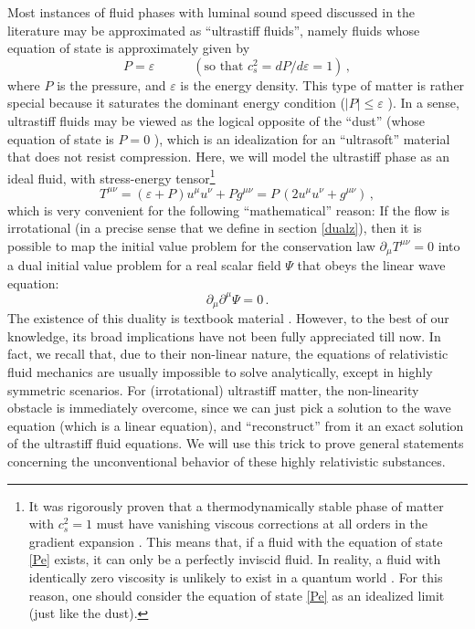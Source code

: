 \documentclass[a4paper, amsfonts, amssymb, amsmath, reprint, showkeys, nofootinbib, twoside,notitlepage,onecolumn]{revtex4-2}
\newcommand{\spc}{\quad \quad \quad}
\theoremstyle{definition}
\theoremstyle{theorem}
\theoremstyle{corollary}
\begin{document}
Most instances of fluid phases with luminal sound speed discussed in the literature \cite{Zeldovich:1961sbr,SonPionCondensate2000by,MooreSpeedofSound2024gmt} may be approximated as ``ultrastiff fluids'', namely fluids whose equation of state is approximately given by
\begin{equation}\label{Pe}
    P=\varepsilon  \spc (\text{so that } c_s^2=dP/d\varepsilon=1) \, ,
\end{equation}
where $P$ is the pressure, and $\varepsilon$ is the energy density. This type of matter is rather special because it saturates the dominant energy condition ($|P|\leq \varepsilon$ \cite[\S 4.3]{HawkingEllis1973uf}). In a sense, ultrastiff fluids may be viewed as the logical opposite of the ``dust'' (whose equation of state is $P=0$ \cite[\S 1.9]{carroll_2019}), which is an idealization for an ``ultrasoft'' material that does not resist compression. Here, we will model the ultrastiff phase as an ideal fluid, with stress-energy tensor\footnote{It was rigorously proven that a thermodynamically stable phase of matter with $c_s^2=1$ must have vanishing viscous corrections at all orders in the gradient expansion \cite{GavassinoBounds2023,HellerHydrohedron2023jtd}. This means that, if a fluid with the equation of state \eqref{Pe} exists, it can only be a perfectly inviscid fluid. In reality, a fluid with identically zero viscosity is unlikely to exist in a quantum world \cite{Kovtun:2004de}. For this reason, one should consider the equation of state \eqref{Pe} as an idealized limit (just like the dust).}
\begin{equation}\label{idealfluid}
    T^{\mu \nu}=(\varepsilon{+}P)u^\mu u^\nu +Pg^{\mu \nu} = P \, (2u^\mu u^\nu {+}g^{\mu \nu}) \, ,
\end{equation}
which is very convenient for the following ``mathematical'' reason: If the flow is irrotational (in a precise sense that we define in section \ref{dualz}), then it is possible to map the initial value problem for the conservation law $\partial_\mu T^{\mu \nu}=0$ into a dual initial value problem for a real scalar field $\Psi$ that obeys the linear wave equation:
\begin{equation}\label{waves}
    \partial_\mu \partial^\mu \Psi=0 \, .
\end{equation}
The existence of this duality is textbook material \cite[\S 3.7.4]{rezzolla_book}. However, to the best of our knowledge, its broad implications have not been fully appreciated till now. In fact, we recall that, due to their non-linear nature, the equations of relativistic fluid mechanics are usually impossible to solve analytically, except in highly symmetric scenarios. For (irrotational) ultrastiff matter, the non-linearity obstacle is immediately overcome, since we can just pick a solution to the wave equation (which is a linear equation), and ``reconstruct'' from it an exact solution of the ultrastiff fluid equations. We will use this trick to prove general statements concerning the unconventional behavior of these highly relativistic substances.
\end{document}
